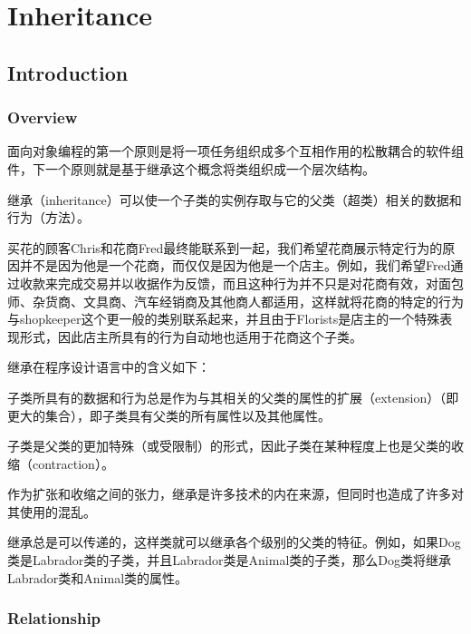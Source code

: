 \part{Inheritance}



\chapter{Introduction}



\section{Overview}


面向对象编程的第一个原则是将一项任务组织成多个互相作用的松散耦合的软件组件，下一个原则就是基于继承这个概念将类组织成一个层次结构。


继承（inheritance）可以使一个子类的实例存取与它的父类（超类）相关的数据和行为（方法）。

买花的顾客Chris和花商Fred最终能联系到一起，我们希望花商展示特定行为的原因并不是因为他是一个花商，而仅仅是因为他是一个店主。例如，我们希望Fred通过收款来完成交易并以收据作为反馈，而且这种行为并不只是对花商有效，对面包师、杂货商、文具商、汽车经销商及其他商人都适用，这样就将花商的特定的行为与shopkeeper这个更一般的类别联系起来，并且由于Florists是店主的一个特殊表现形式，因此店主所具有的行为自动地也适用于花商这个子类。

继承在程序设计语言中的含义如下：

\begin{compactitem}
\item 子类所具有的数据和行为总是作为与其相关的父类的属性的扩展（extension）（即更大的集合），即子类具有父类的所有属性以及其他属性。
\item 子类是父类的更加特殊（或受限制）的形式，因此子类在某种程度上也是父类的收缩（contraction）。
\end{compactitem}

作为扩张和收缩之间的张力，继承是许多技术的内在来源，但同时也造成了许多对其使用的混乱。

继承总是可以传递的，这样类就可以继承各个级别的父类的特征。例如，如果Dog类是Labrador类的子类，并且Labrador类是Animal类的子类，那么Dog类将继承Labrador类和Animal类的属性。


\section{Relationship}




